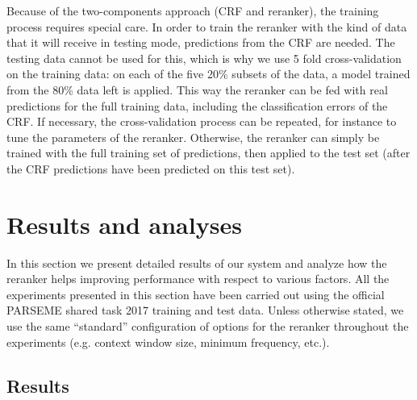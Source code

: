 \documentclass[output=paper
,modfonts
,nonflat]{langsci/langscibook}
\begin{document}
Because of the two-components approach (CRF and reranker), the
training process requires special care. In order to train the reranker
with the kind of data that it will receive in testing mode,
predictions from the CRF are needed. The testing data cannot
be used for this, which is why we use 5 fold cross-validation on the
training data: on each of the five 20\% subsets of the data, a model
trained from the 80\% data left is applied.  This way the reranker can
be fed with real predictions for the full training data, including the
classification errors of the CRF. If necessary, the cross-validation
process can be repeated, for instance to tune the parameters of the
reranker. Otherwise, the reranker can simply be trained with the full
training set of predictions, then applied to the test set (after the
CRF predictions have been predicted on this test set).

\section{\label{moreau:sec:analysis}Results and analyses}


In this section we present detailed results of our system and analyze
how the reranker helps improving performance with respect to various
factors. All the experiments presented in this section have been
carried out using the official PARSEME shared task 2017 training and
test data. Unless otherwise stated, we use the same ``standard''
configuration of options for the reranker throughout the experiments
(e.g. context window size, minimum frequency, etc.).



\subsection{Results}
\end{document}
